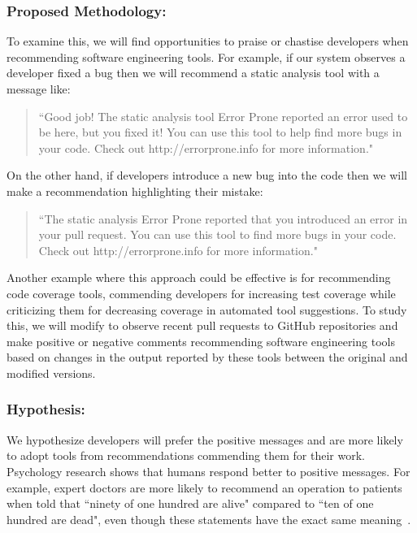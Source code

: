 \subsubsection{Proposed Methodology:}

To examine this, we will find opportunities to praise or chastise developers when recommending software engineering tools. For example, if our system observes a developer fixed a bug then we will recommend a static analysis tool with a message like:

\begin{quote}
    ``Good job! The static analysis tool Error Prone reported an error used to be here, but you fixed it! You can use this tool to help find more bugs in your code. Check out http://errorprone.info for more information."
\end{quote} 

On the other hand, if developers introduce a new bug into the code then we will make a recommendation highlighting their mistake:

\begin{quote}
    ``The static analysis Error Prone reported that you introduced an error in your pull request. You can use this tool to find more bugs in your code. Check out http://errorprone.info for more information."
\end{quote}

Another example where this approach could be effective is for recommending code coverage tools, commending developers for increasing test coverage while criticizing them for decreasing coverage in automated tool suggestions. To study this, we will modify \TOOL to observe recent pull requests to GitHub repositories and make positive or negative comments recommending software engineering tools based on changes in the output reported by these tools between the original and modified versions.


\subsubsection{Hypothesis:}

We hypothesize developers will prefer the positive messages and are more likely to adopt tools from recommendations commending them for their work. Psychology research shows that humans respond better to positive messages. For example, expert doctors are more likely to recommend an operation to patients when told that ``ninety of one hundred are alive" compared to ``ten of one hundred are dead", even though these statements have the exact same meaning~\cite{tversky1973availability}.

